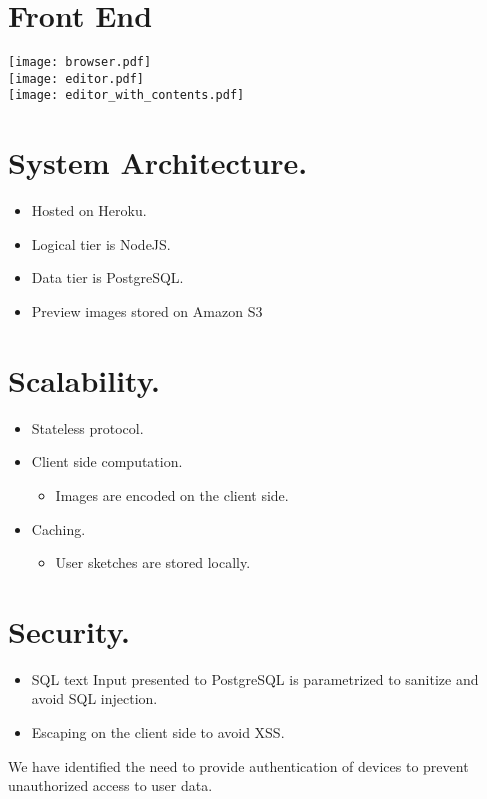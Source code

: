 \documentclass{beamer}
\begin{document}


\section*{Front End}
\texttt{[image: browser.pdf]}
\hfill\\
\texttt{[image: editor.pdf]}
\hfill\\
\texttt{[image: editor\_with\_contents.pdf]}

\newpage
\section*{System Architecture.}
  \begin{itemize}
    \item Hosted on Heroku.
    \item Logical tier is NodeJS.
    \item Data tier is PostgreSQL.
    \item Preview images stored on Amazon S3
  \end{itemize}


\newpage
\section*{Scalability.}
  \begin{itemize}
    \item Stateless protocol.
    \item Client side computation.
    \begin{itemize}
      \item Images are encoded on the client side.
    \end{itemize}
    \item Caching.
    \begin{itemize}
	\item User sketches are stored locally.
    \end{itemize}
   \end{itemize}

\newpage
\section*{Security.}
  \begin{itemize}
    \item SQL text Input presented to PostgreSQL is parametrized to sanitize and avoid SQL injection.
    \item Escaping on the client side to avoid XSS.
  \end{itemize}
We have identified the need to provide authentication of devices to prevent unauthorized access to  user data.
\end{document}
